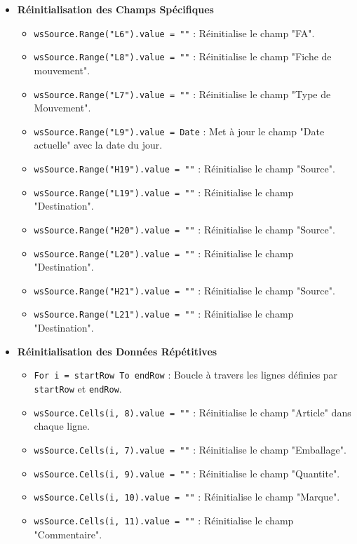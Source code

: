 \documentclass[a4paper, oneside, 12pt, final]{extreport}
\begin{document}
\begin{itemize}
    \item \textbf{Réinitialisation des Champs Spécifiques}
    \begin{itemize}
        \item \texttt{wsSource.Range("L6").value = ""} : Réinitialise le champ "FA".
        \item \texttt{wsSource.Range("L8").value = ""} : Réinitialise le champ "Fiche de mouvement".
        \item \texttt{wsSource.Range("L7").value = ""} : Réinitialise le champ "Type de Mouvement".
        \item \texttt{wsSource.Range("L9").value = Date} : Met à jour le champ "Date actuelle" avec la date du jour.
        \item \texttt{wsSource.Range("H19").value = ""} : Réinitialise le champ "Source".
        \item \texttt{wsSource.Range("L19").value = ""} : Réinitialise le champ "Destination".
        \item \texttt{wsSource.Range("H20").value = ""} : Réinitialise le champ "Source".
        \item \texttt{wsSource.Range("L20").value = ""} : Réinitialise le champ "Destination".
        \item \texttt{wsSource.Range("H21").value = ""} : Réinitialise le champ "Source".
        \item \texttt{wsSource.Range("L21").value = ""} : Réinitialise le champ "Destination".
    \end{itemize}

    \item \textbf{Réinitialisation des Données Répétitives}
    \begin{itemize}
        \item \texttt{For i = startRow To endRow} : Boucle à travers les lignes définies par \texttt{startRow} et \texttt{endRow}.
        \item \texttt{wsSource.Cells(i, 8).value = ""} : Réinitialise le champ "Article" dans chaque ligne.
        \item \texttt{wsSource.Cells(i, 7).value = ""} : Réinitialise le champ "Emballage".
        \item \texttt{wsSource.Cells(i, 9).value = ""} : Réinitialise le champ "Quantite".
        \item \texttt{wsSource.Cells(i, 10).value = ""} : Réinitialise le champ "Marque".
        \item \texttt{wsSource.Cells(i, 11).value = ""} : Réinitialise le champ "Commentaire".
    \end{itemize}


\end{itemize}
\end{document}
